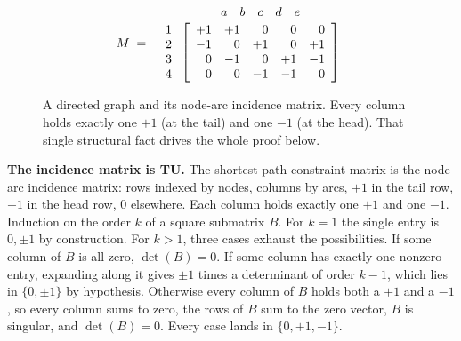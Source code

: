 \documentclass[11pt]{article}
\begin{document}
\begin{figure}[htbp]
\centering
\begin{minipage}{0.34\textwidth}
\centering
{}
\end{minipage}
\hfill
\begin{minipage}{0.60\textwidth}
\centering
\[
  M \;=\;
  \begin{array}{c@{\;}c}
    & \begin{array}{ccccc} a & b & c & d & e \end{array} \\[2pt]
    \begin{array}{c} 1 \\ 2 \\ 3 \\ 4 \end{array} &
    \left[\begin{array}{rrrrr}
       +1 & +1 &  0 &  0 &  0 \\
       -1 &  0 & +1 &  0 & +1 \\
        0 & -1 &  0 & +1 & -1 \\
        0 &  0 & -1 & -1 &  0
    \end{array}\right]
  \end{array}
\]
\end{minipage}
\caption{A directed graph and its node-arc incidence matrix. Every
column holds exactly one $+1$ (at the tail) and one $-1$ (at the head).
That single structural fact drives the whole proof below.}
\end{figure}

\textbf{The incidence matrix is TU.}\quad
The shortest-path constraint matrix is the node-arc incidence matrix:
rows indexed by nodes, columns by arcs, $+1$ in the tail row, $-1$ in
the head row, 0 elsewhere. Each column holds exactly one $+1$ and one
$-1$. Induction on the order $k$ of a square submatrix $B$. For $k = 1$
the single entry is $0, \pm 1$ by construction. For $k > 1$, three cases
exhaust the possibilities. If some column of $B$ is all zero,
$\det(B) = 0$. If some column has exactly one nonzero entry, expanding
along it gives $\pm 1$ times a determinant of order $k - 1$, which lies
in $\{0, \pm 1\}$ by hypothesis. Otherwise every column of $B$ holds
both a $+1$ and a $-1$, so every column sums to zero, the rows of $B$
sum to the zero vector, $B$ is singular, and $\det(B) = 0$. Every case
lands in $\{0, +1, -1\}$.
\end{document}
